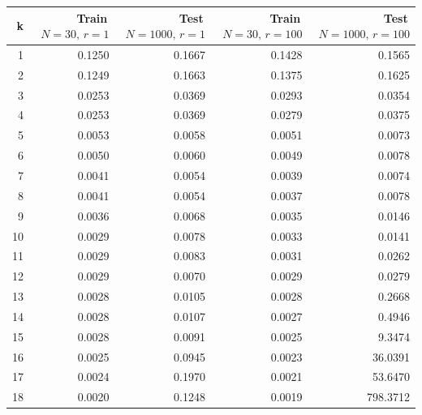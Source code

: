 \begin{tabular}{rrrrr}
\toprule
k & Train\, $N=30,\, r=1$ & Test\, $N=1000,\, r=1$ & Train\, $N=30,\, r=100$ & Test\, $N=1000,\, r=100$ \\
\midrule
1 & 0.1250 & 0.1667 & 0.1428 & 0.1565 \\
2 & 0.1249 & 0.1663 & 0.1375 & 0.1625 \\
3 & 0.0253 & 0.0369 & 0.0293 & 0.0354 \\
4 & 0.0253 & 0.0369 & 0.0279 & 0.0375 \\
5 & 0.0053 & 0.0058 & 0.0051 & 0.0073 \\
6 & 0.0050 & 0.0060 & 0.0049 & 0.0078 \\
7 & 0.0041 & 0.0054 & 0.0039 & 0.0074 \\
8 & 0.0041 & 0.0054 & 0.0037 & 0.0078 \\
9 & 0.0036 & 0.0068 & 0.0035 & 0.0146 \\
10 & 0.0029 & 0.0078 & 0.0033 & 0.0141 \\
11 & 0.0029 & 0.0083 & 0.0031 & 0.0262 \\
12 & 0.0029 & 0.0070 & 0.0029 & 0.0279 \\
13 & 0.0028 & 0.0105 & 0.0028 & 0.2668 \\
14 & 0.0028 & 0.0107 & 0.0027 & 0.4946 \\
15 & 0.0028 & 0.0091 & 0.0025 & 9.3474 \\
16 & 0.0025 & 0.0945 & 0.0023 & 36.0391 \\
17 & 0.0024 & 0.1970 & 0.0021 & 53.6470 \\
18 & 0.0020 & 0.1248 & 0.0019 & 798.3712 \\
\bottomrule
\end{tabular}
